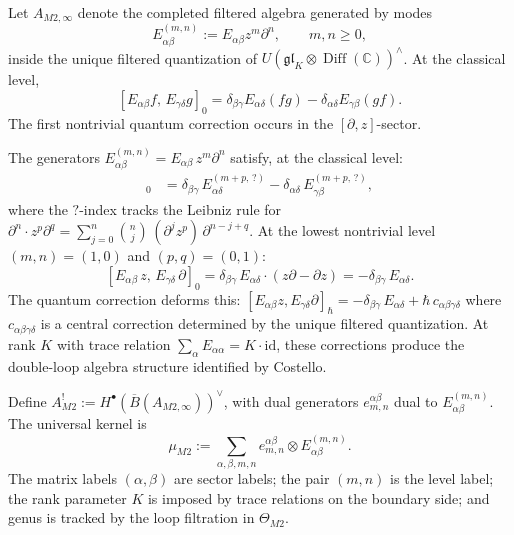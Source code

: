 \begin{definition}
Let $A_{M2,\infty}$ denote the completed filtered algebra generated
by modes
\[
E^{(m,n)}_{\alpha\beta} := E_{\alpha\beta} z^m \partial^n,
\qquad m, n \geq 0,
\]
inside the unique filtered quantization of
$U(\mathfrak{gl}_K \otimes \operatorname{Diff}(\mathbb{C}))^{\wedge}$.
At the classical level,
\[
[E_{\alpha\beta}f,\, E_{\gamma\delta}g]_0
=
\delta_{\beta\gamma}E_{\alpha\delta}(fg)
- \delta_{\alpha\delta}E_{\gamma\beta}(gf).
\]
The first nontrivial quantum correction occurs in the
$[\partial, z]$-sector.
\end{definition}

\begin{example}
The generators $E^{(m,n)}_{\alpha\beta} = E_{\alpha\beta}\,z^m
\partial^n$ satisfy, at the classical level:
\begin{align}
[E^{(m,n)}_{\alpha\beta},\, E^{(p,q)}_{\gamma\delta}]_0
&= \delta_{\beta\gamma}\,E^{(m{+}p,\,?)}_{\alpha\delta}
- \delta_{\alpha\delta}\,E^{(m{+}p,\,?)}_{\gamma\beta},
\end{align}
where the $?$-index tracks the Leibniz rule for $\partial^n \cdot
z^p\partial^q = \sum_{j=0}^n \binom{n}{j}\,
(\partial^j z^p)\,\partial^{n-j+q}$. At the lowest nontrivial
level $(m,n) = (1,0)$ and $(p,q) = (0,1)$:
\[
[E_{\alpha\beta}\,z,\, E_{\gamma\delta}\,\partial]_0
= \delta_{\beta\gamma}\,E_{\alpha\delta}
\cdot (z\partial - \partial z)
= -\delta_{\beta\gamma}\,E_{\alpha\delta}.
\]
The quantum correction deforms this: $[E_{\alpha\beta}z,
E_{\gamma\delta}\partial]_\hbar
= -\delta_{\beta\gamma}\,E_{\alpha\delta}
+ \hbar\,c_{\alpha\beta\gamma\delta}$ where
$c_{\alpha\beta\gamma\delta}$ is a central correction determined
by the unique filtered quantization. At rank $K$ with trace
relation $\sum_\alpha E_{\alpha\alpha} = K\cdot\mathrm{id}$, these
corrections produce the double-loop algebra structure identified
by Costello.
\end{example}

\begin{definition}
Define
$A^!_{M2} := H^\bullet(\overline{B}(A_{M2,\infty}))^{\vee}$,
with dual generators $e^{\alpha\beta}_{m,n}$ dual to
$E^{(m,n)}_{\alpha\beta}$. The universal kernel is
\begin{equation}
\mu_{M2}
:=
\sum_{\alpha,\beta,m,n}
e^{\alpha\beta}_{m,n} \otimes E^{(m,n)}_{\alpha\beta}.
\end{equation}
The matrix labels $(\alpha,\beta)$ are sector labels; the pair
$(m,n)$ is the level label; the rank parameter $K$ is imposed by
trace relations on the boundary side; and genus is tracked by the
loop filtration in $\Theta_{M2}$.
\end{definition}

